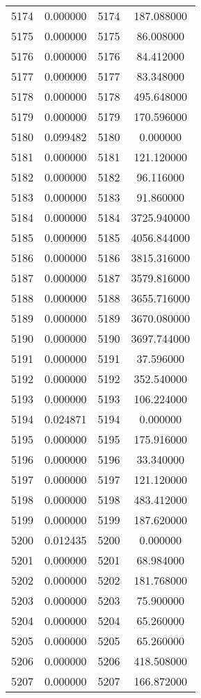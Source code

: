 \documentclass[12pt]{article}
\begin{document}
\begin{longtable}{@{}cccc@{}}
5174 & 0.000000 & 5174 & 187.088000 \\
5175 & 0.000000 & 5175 & 86.008000 \\
5176 & 0.000000 & 5176 & 84.412000 \\
5177 & 0.000000 & 5177 & 83.348000 \\
5178 & 0.000000 & 5178 & 495.648000 \\
5179 & 0.000000 & 5179 & 170.596000 \\
5180 & 0.099482 & 5180 & 0.000000 \\
5181 & 0.000000 & 5181 & 121.120000 \\
5182 & 0.000000 & 5182 & 96.116000 \\
5183 & 0.000000 & 5183 & 91.860000 \\
5184 & 0.000000 & 5184 & 3725.940000 \\
5185 & 0.000000 & 5185 & 4056.844000 \\
5186 & 0.000000 & 5186 & 3815.316000 \\
5187 & 0.000000 & 5187 & 3579.816000 \\
5188 & 0.000000 & 5188 & 3655.716000 \\
5189 & 0.000000 & 5189 & 3670.080000 \\
5190 & 0.000000 & 5190 & 3697.744000 \\
5191 & 0.000000 & 5191 & 37.596000 \\
5192 & 0.000000 & 5192 & 352.540000 \\
5193 & 0.000000 & 5193 & 106.224000 \\
5194 & 0.024871 & 5194 & 0.000000 \\
5195 & 0.000000 & 5195 & 175.916000 \\
5196 & 0.000000 & 5196 & 33.340000 \\
5197 & 0.000000 & 5197 & 121.120000 \\
5198 & 0.000000 & 5198 & 483.412000 \\
5199 & 0.000000 & 5199 & 187.620000 \\
5200 & 0.012435 & 5200 & 0.000000 \\
5201 & 0.000000 & 5201 & 68.984000 \\
5202 & 0.000000 & 5202 & 181.768000 \\
5203 & 0.000000 & 5203 & 75.900000 \\
5204 & 0.000000 & 5204 & 65.260000 \\
5205 & 0.000000 & 5205 & 65.260000 \\
5206 & 0.000000 & 5206 & 418.508000 \\
5207 & 0.000000 & 5207 & 166.872000 \\

\end{longtable}
\end{document}

